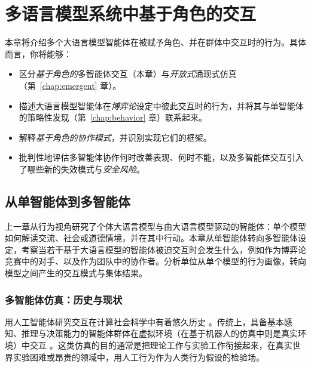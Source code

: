 

\chapter{多语言模型系统中基于角色的交互}\label{chap:roleint}\label{chap:role}

\begin{learningbox}
本章将介绍多个大语言模型智能体在被赋予角色、并在群体中交互时的行为。具体而言，你将能够：
\begin{itemize}[leftmargin=*, nosep]
    \item 区分{\em 基于角色的}多智能体交互（本章）与{\em 开放式}涌现式仿真（第~\ref{chap:emergent} 章）。
    \item 描述大语言模型智能体在{\em 博弈论}设定中彼此交互时的行为，并将其与单智能体的策略性发现（第~\ref{chap:behavior} 章）联系起来。
    \item 解释{\em 基于角色的协作模式}，并识别实现它们的框架。
    \item 批判性地评估多智能体协作何时改善表现、何时不能，以及多智能体交互引入了哪些新的失效模式与{\em 安全风险}。
\end{itemize}
\end{learningbox}

\section{从单智能体到多智能体}
上一章从行为视角研究了个体大语言模型与由大语言模型驱动的智能体：单个模型如何解读交流、社会或道德情境，并在其中行动。本章从单智能体转向多智能体设定，考察当若干基于大语言模型的智能体被迫交互时会发生什么，例如作为博弈论竞赛中的对手、以及作为团队中的协作者。分析单位从单个模型的行为画像，转向模型之间产生的交互模式与集体结果。

\subsection{多智能体仿真：历史与现状}
用人工智能体研究交互在计算社会科学中有着悠久历史 \citep{epstein1996growing,macal_tutorial_2010}。传统上，具备基本感知、推理与决策能力的智能体群体在虚拟环境（在基于机器人的仿真中则是真实环境）中交互 \citep{steels1995self,shoham2008multiagent}。这类仿真的目的通常是把理论工作与实验工作衔接起来，在真实世界实验困难或昂贵的领域中，用人工行为作为人类行为假设的检验场。

